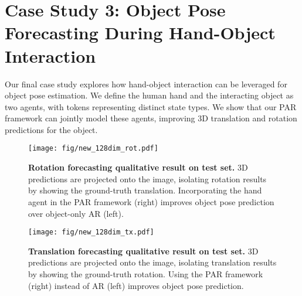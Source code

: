 \section{Case Study 3: Object Pose Forecasting During Hand-Object Interaction}

Our final case study explores how hand-object interaction can be leveraged for object pose estimation. We define the human hand and the interacting object as two agents, with tokens representing distinct state types. We show that our PAR framework can jointly model these agents, improving 3D translation and rotation predictions for the object. 

\begin{figure}
    \centering
    \texttt{[image: fig/new\_128dim\_rot.pdf]}
    \vspace{-20pt}
    \caption{
    \textbf{Rotation forecasting qualitative result on test set.} 3D predictions are projected onto the image, isolating rotation results by showing the ground-truth translation. Incorporating the hand agent in the PAR framework (right) improves object pose prediction over object-only AR (left). %
    }
    \label{fig:ho_qual}
\end{figure}

\begin{figure}
    \centering
    \texttt{[image: fig/new\_128dim\_tx.pdf]}
    \vspace{-20pt}
    \caption{
    \textbf{Translation forecasting qualitative result on test set.} 3D predictions are projected onto the image, isolating translation results by showing the ground-truth rotation. Using the PAR framework (right) instead of AR (left) improves object pose prediction.
    }
    \label{fig:ho_qual2}
    \vspace{-.5cm}
\end{figure}

